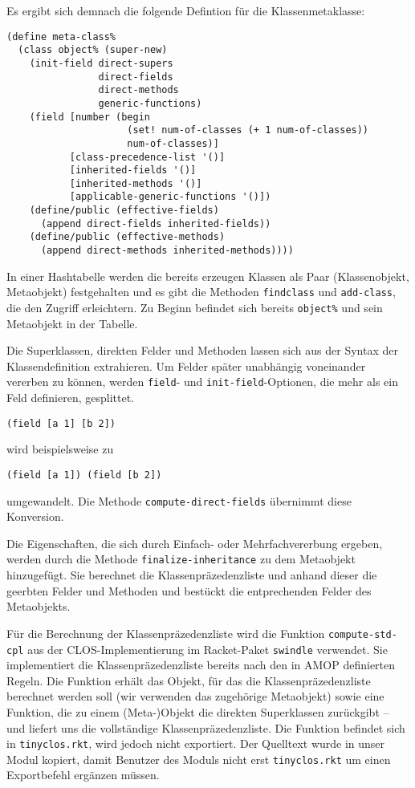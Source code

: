 Es ergibt sich demnach die folgende Defintion für die Klassenmetaklasse:

\begin{lstlisting}
(define meta-class%
  (class object% (super-new)
    (init-field direct-supers
                direct-fields
                direct-methods
                generic-functions)
    (field [number (begin 
                     (set! num-of-classes (+ 1 num-of-classes))
                     num-of-classes)]
           [class-precedence-list '()]
           [inherited-fields '()]
           [inherited-methods '()]
           [applicable-generic-functions '()])    
    (define/public (effective-fields)
      (append direct-fields inherited-fields))
    (define/public (effective-methods)
      (append direct-methods inherited-methods))))
\end{lstlisting}

In einer Hashtabelle werden die bereits erzeugen Klassen als Paar (Klassenobjekt, Metaobjekt) festgehalten und es gibt die Methoden \texttt{findclass} und \texttt{add-class}, die den Zugriff erleichtern. Zu Beginn befindet sich bereits \texttt{object\%} und sein Metaobjekt in der Tabelle.

Die Superklassen, direkten Felder und Methoden lassen sich aus der Syntax der Klassendefinition extrahieren. Um Felder später unabhängig voneinander vererben zu können, werden \texttt{field}- und \texttt{init-field}-Optionen, die mehr als ein Feld definieren, gesplittet. 

\texttt{(field [a 1] [b 2])}

wird beispielsweise zu

\texttt{(field [a 1]) (field [b 2])}

umgewandelt. Die Methode \texttt{compute-direct-fields} übernimmt diese Konversion.

Die Eigenschaften, die sich durch Einfach- oder Mehrfachvererbung ergeben, werden durch die Methode \texttt{finalize-inheritance} zu dem Metaobjekt hinzugefügt. Sie berechnet die Klassenpräzedenzliste und anhand dieser die geerbten Felder und Methoden und bestückt die entprechenden Felder des Metaobjekts.

Für die Berechnung der Klassenpräzedenzliste wird die Funktion \texttt{compute-std-cpl} aus der CLOS-Implementierung im Racket-Paket \texttt{swindle} verwendet. Sie implementiert die Klassenpräzedenzliste bereits nach den in AMOP definierten Regeln. Die Funktion erhält das Objekt, für das die Klassenpräzedenzliste berechnet werden soll (wir verwenden das zugehörige Metaobjekt) sowie eine Funktion, die zu einem (Meta-)Objekt die direkten Superklassen zurückgibt -- und liefert uns die vollständige Klassenpräzedenzliste. Die Funktion befindet sich in \texttt{tinyclos.rkt}, wird jedoch nicht exportiert. Der Quelltext wurde in unser Modul kopiert, damit Benutzer des Moduls nicht erst \texttt{tinyclos.rkt} um einen Exportbefehl ergänzen müssen. 

